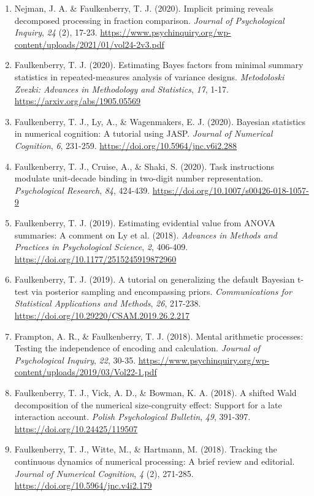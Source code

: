 \documentclass[article,10pt]{article}
\begin{document}
\begin{enumerate}
\item Nejman, J. A. \& Faulkenberry, T. J. (2020). Implicit priming reveals decomposed processing in fraction comparison. \emph{Journal of Psychological Inquiry}, \emph{24} (2), 17-23. \url{https://www.psychinquiry.org/wp-content/uploads/2021/01/vol24-2v3.pdf}
\item Faulkenberry, T. J. (2020). Estimating Bayes factors from minimal summary statistics in repeated-measures analysis of variance designs. \emph{Metodoloski Zvezki: Advances in Methodology and Statistics}, \emph{17}, 1-17.  \url{https://arxiv.org/abs/1905.05569}
\item Faulkenberry, T. J., Ly, A., \& Wagenmakers, E. J. (2020). Bayesian statistics in numerical cognition: A tutorial using JASP. \emph{Journal of Numerical Cognition}, \emph{6}, 231-259. \url{https://doi.org/10.5964/jnc.v6i2.288}
\item Faulkenberry, T. J., Cruise, A., \& Shaki, S. (2020). Task instructions modulate unit-decade binding in two-digit number representation. \emph{Psychological Research}, \emph{84}, 424-439. \url{https://doi.org/}\href{https://dx.doi.org/10.1007/s00426-018-1057-9}{10.1007/s00426-018-1057-9}
\item Faulkenberry, T. J. (2019). Estimating evidential value from ANOVA summaries: A comment on Ly et al. (2018). \emph{Advances in Methods and Practices in Psychological Science}, \emph{2}, 406-409. \url{https://doi.org/}\href{https://doi.org/10.1177/2515245919872960}{10.1177/2515245919872960}
\item Faulkenberry, T. J. (2019). A tutorial on generalizing the default Bayesian t-test via posterior sampling and encompassing priors. \emph{Communications for Statistical Applications and Methods}, \emph{26}, 217-238. \url{https://doi.org/}\href{https://doi.org/10.29220/CSAM.2019.26.2.217}{10.29220/CSAM.2019.26.2.217}
\item Frampton, A. R., \& Faulkenberry, T. J. (2018). Mental arithmetic processes: Testing the independence of encoding and calculation. \emph{Journal of Psychological Inquiry}, \emph{22}, 30-35. \url{https://www.psychinquiry.org/wp-content/uploads/2019/03/Vol22-1.pdf}
\item Faulkenberry, T. J., Vick, A. D., \& Bowman, K. A. (2018). A shifted Wald decomposition of the numerical size-congruity effect: Support for a late interaction account. \emph{Polish Psychological Bulletin}, \emph{49}, 391-397. \url{https://doi.org/}\href{http://dx.doi.org/10.24425/119507}{10.24425/119507}
\item Faulkenberry, T. J., Witte, M., \& Hartmann, M. (2018). Tracking the continuous dynamics of numerical processing: A brief review and editorial. \emph{Journal of Numerical Cognition}, \emph{4} (2), 271-285. \url{https://doi.org/}\href{http://dx.doi.org/10.5964/jnc.v4i2.179}{10.5964/jnc.v4i2.179}

\end{enumerate}
\end{document}
